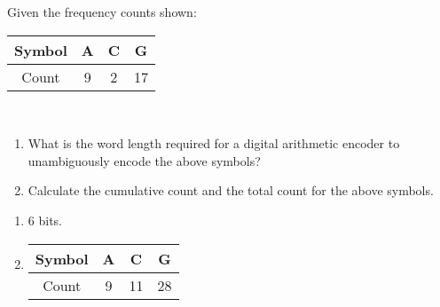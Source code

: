 

\begin{question}
Given the frequency counts shown: \\
\begin{tabular}{|c|c|c|c|}
\hline 
Symbol & A & C & G \\ 
\hline 
Count & 9 & 2 & 17 \\ 
\hline 
\end{tabular} \\
\begin{enumerate}
\item  What is the word length required for a digital arithmetic encoder to unambiguously encode the above symbols?
\item Calculate the cumulative count and the total count for the above symbols.
\end{enumerate}
\end{question}
\begin{solution}
\begin{enumerate}
\item 6 bits.
\item \begin{tabular}{|c|c|c|c|}
\hline 
Symbol & A & C & G \\ 
\hline 
Count & 9 & 11 & 28 \\ 
\hline 
\end{tabular} \\
\end{enumerate}
\end{solution}

